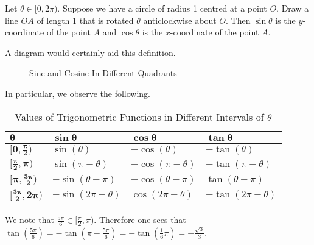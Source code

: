 \begin{definition}
    Let $\theta \in [0, 2\pi)$. Suppose we have a circle of radius 1 centred at a point $O$. Draw a line $OA$ of length 1 that is rotated $\theta$ anticlockwise about $O$. Then $\sin\theta$ is the $y$-coordinate of the point $A$ and  $\cos\theta$ is the $x$-coordinate of the point $A$.
\end{definition}

A diagram would certainly aid this definition.

\begin{figure}[H]
    \centering
    \caption{Sine and Cosine In Different Quadrants}
\end{figure}

In particular, we observe the following.
\begin{table}[H]
    \centering
    \begin{tabular}{|l|l|l|l|}
        \hline
        $\boldsymbol{\theta}$ & $\boldsymbol{\sin\theta}$ & $\boldsymbol{\cos\theta}$ & $\boldsymbol{\tan\theta}$ \\ \hline
        $\boldsymbol{[0,\frac\pi2)}$ & $\sin(\theta)$ & $-\cos(\theta)$ & $-\tan(\theta)$ \\ \hline
        $\boldsymbol{[\frac\pi2, \pi)}$ & $\sin(\pi-\theta)$ & $-\cos(\pi-\theta)$ & $-\tan(\pi-\theta)$ \\ \hline
        $\boldsymbol{[\pi,\frac{3\pi}2)}$ & $-\sin(\theta-\pi)$ & $-\cos(\theta-\pi)$ & $\tan(\theta-\pi)$ \\ \hline
        $\boldsymbol{[\frac{3\pi}2, 2\pi)}$ & $-\sin(2\pi-\theta)$ & $\cos(2\pi-\theta)$ & $-\tan(2\pi-\theta)$ \\ \hline
    \end{tabular}
    \caption{Values of Trigonometric Functions in Different Intervals of $\theta$}
\end{table}

\begin{example}
    We note that $\frac{5\pi}6 \in [\frac\pi2, \pi)$. Therefore one sees that $\tan(\frac{5\pi}{6}) = -\tan(\pi-\frac{5\pi}{6}) = -\tan(\frac16\pi) = -\frac{\sqrt3}3$.
\end{example}

